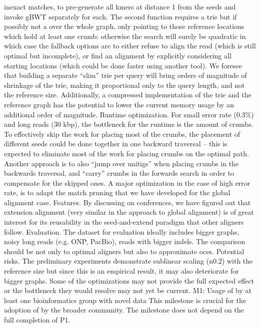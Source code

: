 inexact matches, to pre-generate all kmers at distance 1 from the seeds and
invoke gBWT separately for each. The second function requires a trie but if
possibly not a over the whole graph, only pointing to those reference locations
which hold at least one crumb: otherwise the \A search will surely be quadratic
in which case the fallback options are to either refuse to align the read (which
is still optimal but incomplete), or find an alignment by explicitly considering
all starting locations (which could be done faster using another tool). We
foresee that building a separate “slim” trie per query will bring orders of
magnitude of shrinkage of the trie, making it proportional only to the query
length, and not the reference size. Additionally, a compressed implementation of
the trie and the reference graph has the potential to lower the current memory
usage by an additional order of magnitude. Runtime optimization. For small error
rate (0.3\%) and long reads (30 kbp), the bottleneck for the runtime is the
amount of crumbs. To effectively skip the work for placing most of the crumbs,
the placement of different seeds could be done together in one backward
traversal – this is expected to eliminate most of the work for placing crumbs on
the optimal path.  Another approach is to also “jump over unitigs” when placing
crumbs in the backwards traversal, and “carry” crumbs in the forwards \A search
in order to compensate for the skipped ones. A major optimization in the case of
high error rate, is to adapt the match pruning that we have developed for the
global alignment case. Features. By discussing \astarix on conferences, we have
figured out that extension alignment (very similar in the approach to global
alignment) is of great interest for its reusability in the seed-and-extend
paradigm that other aligners follow. Evaluation. The dataset for evaluation
ideally includes bigger graphs, noisy long reads (e.g. ONP, PacBio), reads with
bigger indels. The comparison should be not only to optimal aligners but also to
approximate oces. Potential risks. The preliminary experiments demonstrate
sublinear scaling (n0.2) with the reference size but since this is an empirical
result, it may also deteriorate for bigger graphs. Some of the optimizations may
not provide the full expected effect or the bottleneck they would resolve may
not yet be current. M1: Usage of \astarix by at least one bioinformatics group
with novel data This milestone is crucial for the adoption of \astarix by the
broader community. The milestone does not depend on the full completion of P1.

